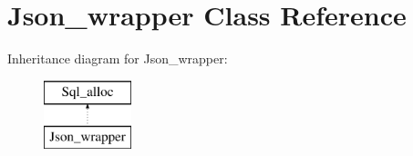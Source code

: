 \hypertarget{classJson__wrapper}{}\section{Json\+\_\+wrapper Class Reference}
\label{classJson__wrapper}
Inheritance diagram for Json\+\_\+wrapper\+:\begin{figure}[H]
\begin{center}
\leavevmode
\includegraphics[height=2.000000cm]{classJson__wrapper}
\end{center}
\end{figure}
